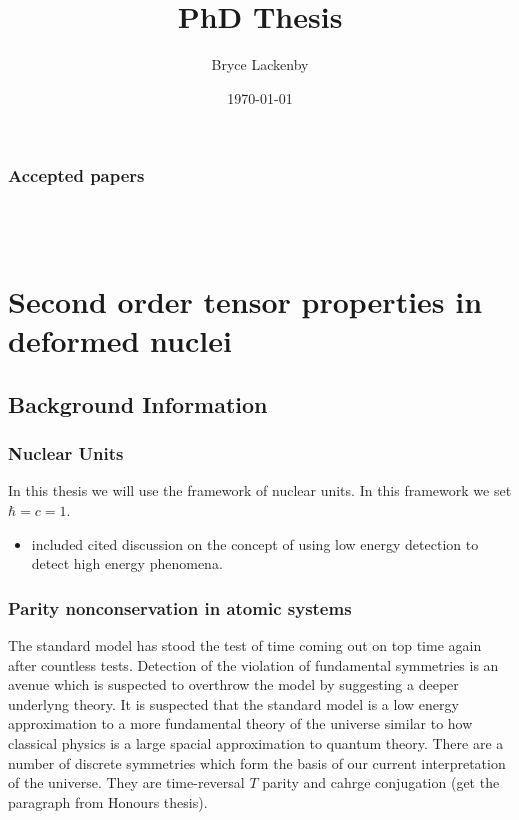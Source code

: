 \documentclass[10pt,a4paper, twoside]{report}
\begin{document}
\doublespacing
\title{PhD Thesis}
\date{\today}
\author{Bryce Lackenby}

\maketitle
\tableofcontents
\listoffigures
\listoftables
\pagebreak
\section*{Accepted papers}
\cite{LDFDb2018}  \\
\cite{LFWQM2018}  \\
\cite{LDFOg2018} 
\part{Second order tensor properties in deformed nuclei}

\chapter{Background Information}
\section{Nuclear Units}
In this thesis we will use the framework of nuclear units. In this framework we set $\hbar = c = 1$. 
\begin{itemize}
\item included cited discussion on the concept of using low energy detection to detect high energy phenomena.
\end{itemize}
\section{Parity nonconservation in atomic systems}
The standard model has stood the test of time coming out on top time again after countless tests. Detection of the violation of fundamental symmetries is an avenue which is suspected to overthrow the model by suggesting a deeper underlyng theory. It is suspected that the standard model is a low energy approximation to a more fundamental theory of the universe similar to how classical physics is a large spacial approximation to quantum theory. There are a number of discrete symmetries which form the basis of our current interpretation of the universe. They are time-reversal $T$ parity and cahrge conjugation (get the paragraph from Honours thesis). \\
\end{document}
